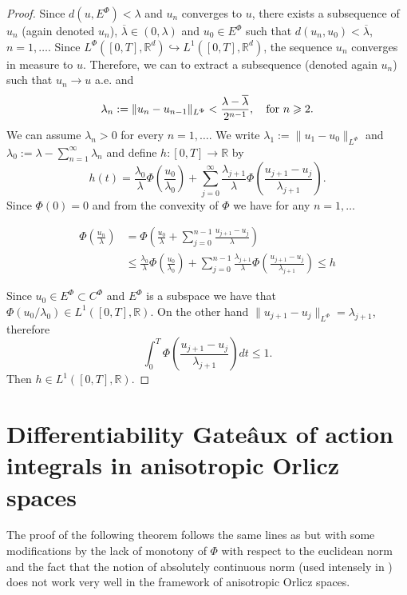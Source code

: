 \documentclass[twoside]{article}
\theoremstyle{remark}
\newcommand{\orlnor}{\|_{L^{\Phi}}}
\newcommand{\lphi}{L^{\Phi}}
\newcommand{\ephi}{E^{\Phi}}
\newcommand{\claseor}{C^{\Phi}}
\newcommand{\rr}{\mathbb{R}}
\renewcommand{\leq}{\leqslant}
\renewcommand{\geq}{\geqslant}
\begin{document}
\begin{proof}
  Since $d({u},\ephi)<\lambda$ and ${u}_n$ converges to ${u}$, there exists   a subsequence of $u_n$ (again denoted $u_n$), $\overline{\lambda}\in (0,\lambda)$ and $u_0\in\ephi$ such that $d(u_n,u_0)<\overline{\lambda}$, $n=1,\ldots$. Since $\lphi\left([0,T],\rr^d\right)\hookrightarrow L^1\left([0,T],\rr^d\right)$, the sequence $u_n$ converges in measure to $u$. Therefore, we can to extract a subsequence (denoted again $u_n$) such that $u_n\to u$ a.e. and
  \[\lambda_{n}:=\|{u}_{n}-{u}_{n-1}\orlnor<\frac{\lambda-\overline{\lambda}}{2^{n-1}},\quad\hbox{for } n\geq 2.\]
 We can assume $\lambda_n>0$ for every $n=1,\ldots$. We write $\lambda_1:=\|u_1-u_0\orlnor$ and  $\lambda_0:=\lambda-\sum_{n=1}^{\infty}\lambda_n$ and define $h:[0,T]\rightarrow\mathbb{R}$  by
 \begin{equation}\label{eq:serie} h(t)=  \frac{\lambda_0}{\lambda}\Phi\left(\frac{u_0}{\lambda_0}\right)+\sum_{j=0}^{\infty}\frac{\lambda_{j+1}}{\lambda}\Phi\left(\frac{u_{j+1}-u_j}{\lambda_{j+1}}\right).
\end{equation}
 Since $\Phi(0)=0$ and from the convexity of $\Phi$ we have for any $n=1,\ldots$


\[
 \begin{split}
   \Phi\left(\frac{u_n}{\lambda}\right) &=\Phi\left(  \frac{u_0}{\lambda}+   \sum_{j=0}^{n-1}\frac{u_{j+1}-u_j}{\lambda} \right)\\
   &\leq
   \frac{\lambda_0}{\lambda}\Phi\left(\frac{u_0}{\lambda_0}\right)+\sum_{j=0}^{n-1}\frac{\lambda_{j+1}}{\lambda}\Phi\left(\frac{u_{j+1}-u_j}{\lambda_{j+1}}\right) \leq h
 \end{split}
\]

Since $u_0\in\ephi\subset \claseor$ and $\ephi$ is a subspace we have that $\Phi(u_0/\lambda_0)\in L^1([0,T],\rr)$.
On the other hand $\|u_{j+1}-u_j\orlnor = \lambda_{j+1}$, therefore
\[
\int_0^T\Phi\left(\frac{u_{j+1}-u_j}{\lambda_{j+1}}\right)dt\leq 1.
\]
Then $h\in L^1([0,T],\rr)$.



\end{proof}





\section{Differentiability Gate\^aux of action integrals in anisotropic Orlicz spaces}


The  proof of the following theorem follows the same lines as \cite[Th. 3.2]{ABGMS2015} but with some modifications by the lack of monotony of $\Phi$ with  respect to the euclidean norm and the fact that  the notion of absolutely continuous norm (used intensely in \cite[Th. 3.2]{ABGMS2015}) does not work very well in the framework of anisotropic Orlicz spaces.
\end{document}
